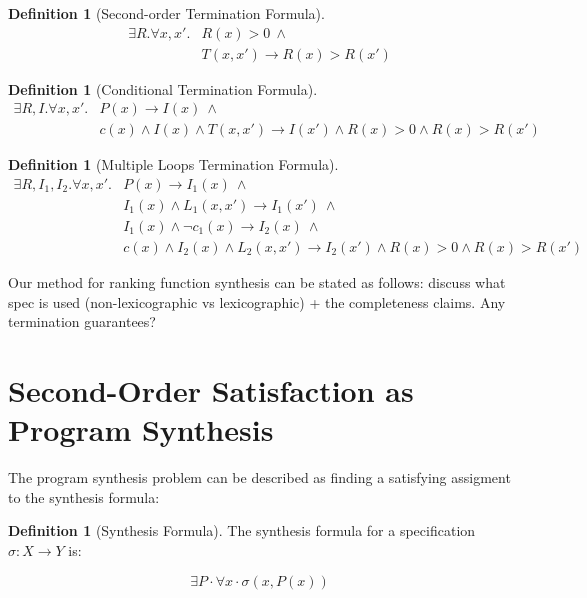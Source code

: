 \documentclass[preprint]{sigplanconf}
\theoremstyle{definition}
\newtheorem{definition}[theorem]{Definition}
\begin{document}
\begin{figure*}
\begin{definition}[Second-order Termination Formula]
\begin{align*}
 \exists R . \forall x, x' . & R(x) > 0 ~ \wedge \\
                             & T(x, x') \rightarrow R(x) > R(x')
\end{align*}
\end{definition}

\begin{definition}[Conditional Termination Formula]
 \begin{align*}
  \exists R, I . \forall x, x' . & P(x) \rightarrow I(x) ~ \wedge \\
                                 & c(x) \wedge I(x) \wedge T(x, x') \rightarrow I(x') \wedge R(x) > 0 \wedge R(x) > R(x')
 \end{align*}
\end{definition}

\begin{definition}[Multiple Loops Termination Formula]
 \begin{align*}
  \exists R, I_1, I_2 . \forall x, x' . & P(x) \rightarrow I_1(x) ~ \wedge \\
                                        & I_1(x) \wedge L_1(x, x') \rightarrow I_1(x') ~ \wedge \\
                                        & I_1(x) \wedge \lnot c_1(x) \rightarrow I_2(x) ~ \wedge \\
                                        & c(x) \wedge I_2(x) \wedge L_2(x, x') \rightarrow I_2(x') \wedge R(x) > 0 \wedge R(x) > R(x')
 \end{align*}
\end{definition}
\end{figure*}

Our method for ranking function synthesis can be stated as follows:
discuss what spec is used (non-lexicographic vs lexicographic) + the completeness claims.
Any termination guarantees?  

\section{Second-Order Satisfaction as Program Synthesis}
The program synthesis problem can be described as finding a satisfying assigment to the
synthesis formula:

\begin{definition}[Synthesis Formula]
 The synthesis formula for a specification $\sigma: X \to Y$ is:
 
 $$\exists P \cdotp \forall x \cdotp \sigma(x, P(x))$$
 \end{definition}
\end{document}
